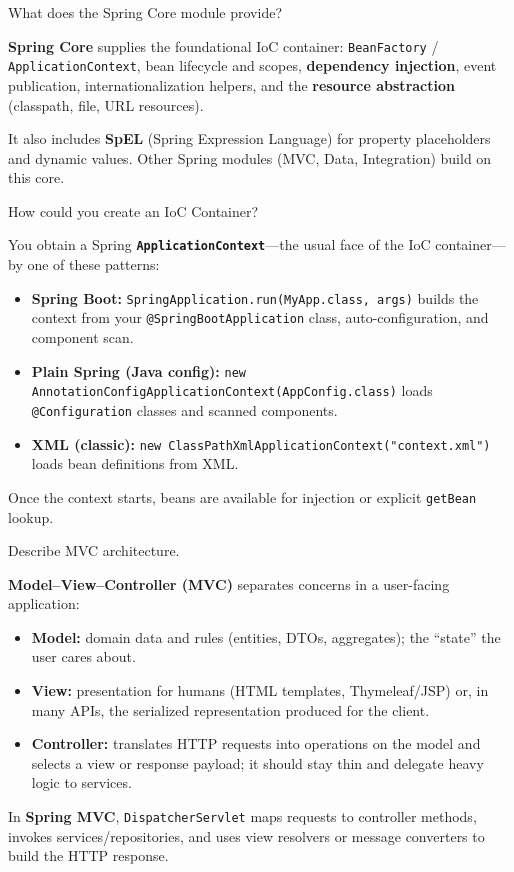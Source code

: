 \question[4]
What does the Spring Core module provide?
\begin{solutionorbox}[1.2in]
  \textbf{Spring Core} supplies the foundational IoC container: \texttt{BeanFactory} / \texttt{ApplicationContext}, bean lifecycle and scopes, \textbf{dependency injection}, event publication, internationalization helpers, and the \textbf{resource abstraction} (classpath, file, URL resources).

  It also includes \textbf{SpEL} (Spring Expression Language) for property placeholders and dynamic values. Other Spring modules (MVC, Data, Integration) build on this core.
\end{solutionorbox}

\question[4]
How could you create an IoC Container?
\begin{solutionorbox}[1.2in]
  You obtain a Spring \textbf{\texttt{ApplicationContext}}---the usual face of the IoC container---by one of these patterns:
  \begin{itemize}
    \item \textbf{Spring Boot:} \texttt{SpringApplication.run(MyApp.class, args)} builds the context from your \texttt{@SpringBootApplication} class, auto-configuration, and component scan.
    \item \textbf{Plain Spring (Java config):} \texttt{new AnnotationConfigApplicationContext(AppConfig.class)} loads \texttt{@Configuration} classes and scanned components.
    \item \textbf{XML (classic):} \texttt{new ClassPathXmlApplicationContext("context.xml")} loads bean definitions from XML.
  \end{itemize}
  Once the context starts, beans are available for injection or explicit \texttt{getBean} lookup.
\end{solutionorbox}

\newpage


\question[4]
Describe MVC architecture.
\begin{solutionorbox}[1.35in]
  \textbf{Model--View--Controller (MVC)} separates concerns in a user-facing application:
  \begin{itemize}
    \item \textbf{Model:} domain data and rules (entities, DTOs, aggregates); the ``state'' the user cares about.
    \item \textbf{View:} presentation for humans (HTML templates, Thymeleaf/JSP) or, in many APIs, the serialized representation produced for the client.
    \item \textbf{Controller:} translates HTTP requests into operations on the model and selects a view or response payload; it should stay thin and delegate heavy logic to services.
  \end{itemize}
  In \textbf{Spring MVC}, \texttt{DispatcherServlet} maps requests to controller methods, invokes services/repositories, and uses view resolvers or message converters to build the HTTP response.
\end{solutionorbox}

